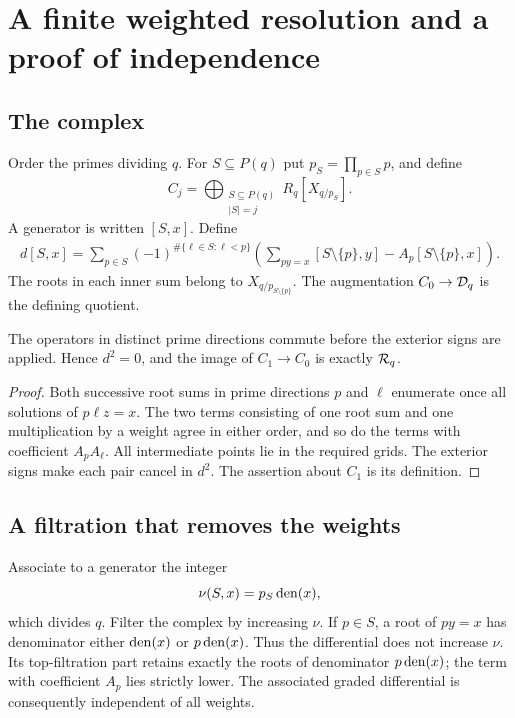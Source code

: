 \section{A finite weighted resolution and a proof of independence}
\label{ir:sec:resolution}

\subsection{The complex}
Order the primes dividing $q$. For $S\subseteq P(q)$ put
$p_S=\prod_{p\in S}p$, and define
\begin{equation}\label{ir:eq:chain-groups}
 C_j=\bigoplus_{\substack{S\subseteq P(q)\\|S|=j}}
       R_q[X_{q/p_S}].
\end{equation}
A generator is written $[S,x]$. Define
\begin{align}
 d[S,x]=\sum_{p\in S}(-1)^{\#\{\ell\in S:\ell<p\}}
 \left(\sum_{py=x}[S\setminus\{p\},y]
       -A_p[S\setminus\{p\},x]\right).
 \label{ir:eq:chain-differential}
\end{align}
The roots in each inner sum belong to $X_{q/p_{S\setminus\{p\}}}$.
The augmentation $C_0\to\mathcal D_q$ is the defining quotient.

\begin{lemma}\label{ir:lem:complex}
The operators in distinct prime directions commute before the exterior
signs are applied. Hence $d^2=0$, and the image of $C_1\to C_0$ is
exactly $\mathcal R_q$.
\end{lemma}
\begin{proof}
Both successive root sums in prime directions $p$ and $\ell$ enumerate
once all solutions of $p\ell z=x$. The two terms consisting of one
root sum and one multiplication by a weight agree in either order,
and so do the terms with coefficient $A_pA_\ell$. All intermediate
points lie in the required grids. The exterior signs make each pair
cancel in $d^2$. The assertion about $C_1$ is its definition.
\end{proof}

\subsection{A filtration that removes the weights}
Associate to a generator the integer
\begin{equation}\label{ir:eq:augmented-conductor}
 \nu(S,x)=p_S\operatorname{den}(x),
\end{equation}
which divides $q$. Filter the complex by increasing $\nu$.
If $p\in S$, a root of $py=x$ has denominator either
$\operatorname{den}(x)$ or $p\operatorname{den}(x)$. Thus the differential does not increase
$\nu$. Its top-filtration part retains exactly the roots of denominator
$p\operatorname{den}(x)$; the term with coefficient $A_p$ lies strictly lower.
The associated graded differential is consequently independent of all
weights.

